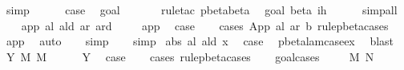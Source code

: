 \begin{isabellebody}
\ simp{\isacharplus}\isanewline
\ \ \ \ \isamarkupfalse%
\ {\isacharquery}case\ \isamarkupfalse%
\ goal{}\ \isanewline
\ \ \ \ \isamarkupfalse%
\ {\isacharparenleft}rule{\isacharunderscore}tac\ pbeta{\isachardot}beta{\isacharparenright}\ \isamarkupfalse%
\ goal{}\ beta\ ih\isanewline
\ \ \ \ \isamarkupfalse%
\ simp{\isacharunderscore}all\isanewline
\ \ \isamarkupfalse%
\isanewline
{}\isamarkupfalse%
\isanewline
{}\isamarkupfalse%
\ {\isacharparenleft}app\ al\ ald\ ar\ ard{\isacharparenright}\ \isanewline
\ \ \isamarkupfalse%
\ app{\isacharparenleft}{}{\isacharcomma}{}{\isacharcomma}{}{\isacharparenright}\ \isamarkupfalse%
\ {\isacharquery}case\isanewline
\ \ \isamarkupfalse%
\ {\isacharparenleft}cases\ {\isachardoublequoteopen}App\ al\ ar{\isachardoublequoteclose}\ b\ rule{\isacharcolon}pbeta{\isachardot}cases{\isacharparenright}\isanewline
\ \ \isamarkupfalse%
\ app\ \isamarkupfalse%
\ auto{\isacharbrackleft}{}{\isacharbrackright}\isanewline
\ \ \isamarkupfalse%
\ simp\isanewline
\ \ \isamarkupfalse%
\ simp\isanewline
{}\isamarkupfalse%
\isanewline
{}\isamarkupfalse%
\ {\isacharparenleft}abs\ al\ ald\ x{\isacharparenright}\ \isamarkupfalse%
\ {\isacharquery}case\ \isamarkupfalse%
\ pbeta{\isacharunderscore}lam{\isacharunderscore}case{\isacharunderscore}ex\ \isamarkupfalse%
\ blast\isanewline
{}\isamarkupfalse%
\isanewline
{}\isamarkupfalse%
\ {\isacharparenleft}Y\ M\ M{\isacharprime}\ {\isasymsigma}{\isacharparenright}\ \isanewline
\ \ \isamarkupfalse%
\ Y{\isacharparenleft}{}{\isacharparenright}\ \isamarkupfalse%
\ {\isacharquery}case\isanewline
\ \ \isamarkupfalse%
\ {\isacharparenleft}cases\ rule{\isacharcolon}pbeta{\isachardot}cases{\isacharparenright}\isanewline
\ \ \isamarkupfalse%
\ goal{\isacharunderscore}cases\isanewline
\ \ \isamarkupfalse%
\ {\isacharparenleft}{}\ M{\isacharprime}{\isacharprime}\ N{\isacharprime}{\isacharprime}{\isacharparenright}\isanewline
\ \ \ \ \isamarkupfalse%
\ {}{\isacharparenleft}{}{\isacharparenright}\ \isamarkupfalse%

\end{isabellebody}

